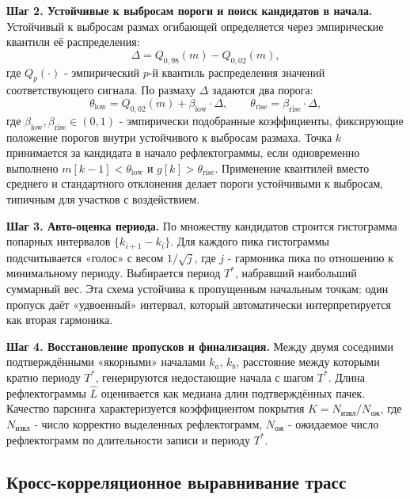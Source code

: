 \documentclass[12pt,a4paper]{extarticle}
\begin{document}
\textbf{Шаг 2. Устойчивые к выбросам пороги и поиск кандидатов в начала.} Устойчивый к выбросам размах огибающей определяется через эмпирические квантили её распределения:
\begin{equation}
  \Delta = Q_{0{,}98}(m) - Q_{0{,}02}(m),
\end{equation}
где $Q_p(\cdot)$ - эмпирический $p$-й квантиль распределения значений соответствующего сигнала. По размаху $\Delta$ задаются два порога:
\begin{equation}
  \theta_\text{low} = Q_{0{,}02}(m) + \beta_\text{low} \cdot \Delta, \qquad
  \theta_\text{rise} = \beta_\text{rise} \cdot \Delta,
\end{equation}
где $\beta_\text{low}, \beta_\text{rise} \in (0, 1)$ - эмпирически подобранные коэффициенты, фиксирующие положение порогов внутри устойчивого к выбросам размаха. Точка $k$ принимается за кандидата в начало рефлектограммы, если одновременно выполнено $m[k-1] < \theta_\text{low}$ и $g[k] > \theta_\text{rise}$. Применение квантилей вместо среднего и стандартного отклонения делает пороги устойчивыми к выбросам, типичным для участков с воздействием.

\textbf{Шаг 3. Авто-оценка периода.} По множеству кандидатов строится гистограмма попарных интервалов $\{k_{i+1} - k_i\}$. Для каждого пика гистограммы подсчитывается «голос» с весом $1/\sqrt{j}$, где $j$ - гармоника пика по отношению к минимальному периоду. Выбирается период $T^*$, набравший наибольший суммарный вес. Эта схема устойчива к пропущенным начальным точкам: один пропуск даёт «удвоенный» интервал, который автоматически интерпретируется как вторая гармоника.

\textbf{Шаг 4. Восстановление пропусков и финализация.} Между двумя соседними подтверждёнными «якорными» началами $k_a$, $k_b$, расстояние между которыми кратно периоду $T^*$, генерируются недостающие начала с шагом $T^*$. Длина рефлектограммы $\hat{L}$ оценивается как медиана длин подтверждённых пачек. Качество парсинга характеризуется коэффициентом покрытия $K = N_\text{извл}/N_\text{ож}$, где $N_\text{извл}$ - число корректно выделенных рефлектограмм, $N_\text{ож}$ - ожидаемое число рефлектограмм по длительности записи и периоду $T^*$.

\subsection{Кросс-корреляционное выравнивание трасс}
\label{sec:alignment}
\end{document}
